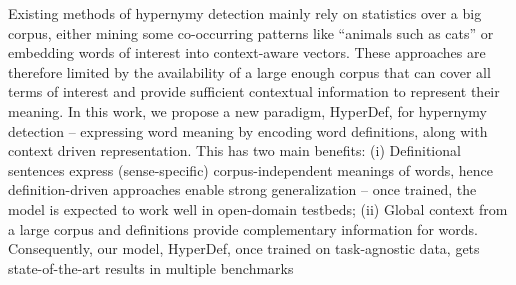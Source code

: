 Existing methods of hypernymy detection mainly rely on statistics over a big corpus, either mining some co-occurring patterns like ``animals such as cats'' or embedding words of interest into context-aware vectors. These approaches are therefore limited by the availability of a large enough corpus that can cover all terms of interest and provide sufficient contextual information to represent their meaning. In this work, we propose  a new paradigm, HyperDef, for hypernymy detection -- expressing  word meaning by encoding word definitions, along with context driven representation. This has two main benefits: (i) Definitional sentences express (sense-specific) corpus-independent meanings of words, hence definition-driven approaches enable strong generalization -- once trained, the model is expected to work well in open-domain testbeds; (ii) Global context from a large corpus and  definitions provide complementary information for words. Consequently, our model, HyperDef, once trained on task-agnostic data, gets state-of-the-art results in multiple benchmarks

